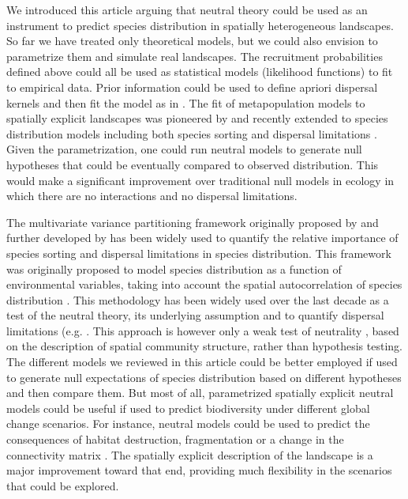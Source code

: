 \documentclass[12pt]{article}
\begin{document}
We introduced this article arguing that neutral theory could be used as an
instrument to predict species distribution in spatially heterogeneous
landscapes. So far we have treated only theoretical models, but we could also
envision to parametrize them and simulate real landscapes. The recruitment
probabilities defined above could all be used as statistical models (likelihood
functions) to fit to empirical data. Prior information could be used to define
apriori dispersal kernels and then fit the model as in \textcite{Gravel2008}.
The fit of metapopulation models to spatially explicit landscapes was pioneered
by \textcite{Hanski1998} and recently extended to species distribution models
including both species sorting and dispersal limitations
\parencite{Boulangeat2012}. Given the parametrization, one could run neutral
models to generate null hypotheses that could be eventually compared to observed
distribution. This would make a significant improvement over traditional null
models in ecology \parencite{Gotelli1996} in which there are no interactions and no dispersal
limitations.

The multivariate variance partitioning framework originally proposed by
\textcite{Borcard1992} and further developed by \textcite{Borcard2002} has been
widely used to quantify the relative importance of species sorting and dispersal
limitations in species distribution. This framework was originally proposed to
model species distribution as a function of environmental variables, taking into
account the spatial autocorrelation of species distribution
\parencite{Leduc1992, Borcard1992, Legendre1993}. This methodology has been
widely used over the last decade as a test of the neutral theory, its underlying
assumption and to quantify dispersal limitations (e.g. \textcite{Svenning2004,
Hardy2004, Gilbert2004, Cottenie2005}. This approach is however only a weak test
of neutrality \parencite{McGill2003}, based on the description of spatial
community structure, rather than hypothesis testing. The different models we
reviewed in this article could be better employed if used to generate null
expectations of species distribution based on different hypotheses and then
compare them. But most of all, parametrized spatially explicit neutral models
could be useful if used to predict biodiversity under different global
change scenarios. For instance, neutral models could be used to predict the
consequences of habitat destruction, fragmentation or a change in the
connectivity matrix \parencite{Hubbell2008}. The spatially explicit description
of the landscape is a major improvement toward that end, providing much
flexibility in the scenarios that could be explored.
\end{document}
